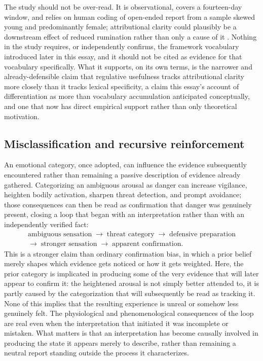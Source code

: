 \documentclass[11pt]{article}
\begin{document}
The study should not be over-read. It is observational, covers a fourteen-day window, and relies on human coding of open-ended report from a sample skewed young and predominantly female; attributional clarity could plausibly be a downstream effect of reduced rumination rather than only a cause of it \citep{LunsfordEddington2026}. Nothing in the study requires, or independently confirms, the framework vocabulary introduced later in this essay, and it should not be cited as evidence for that vocabulary specifically. What it supports, on its own terms, is the narrower and already-defensible claim that regulative usefulness tracks attributional clarity more closely than it tracks lexical specificity, a claim this essay's account of differentiation as more than vocabulary accumulation anticipated conceptually, and one that now has direct empirical support rather than only theoretical motivation.

\subsection{Misclassification and recursive reinforcement}\label{sub:loop}

An emotional category, once adopted, can influence the evidence subsequently encountered rather than remaining a passive description of evidence already gathered. Categorizing an ambiguous arousal as danger can increase vigilance, heighten bodily activation, sharpen threat detection, and prompt avoidance; those consequences can then be read as confirmation that danger was genuinely present, closing a loop that began with an interpretation rather than with an independently verified fact:
\[
\begin{gathered}\text{ambiguous sensation} \;\rightarrow\; \text{threat category} \;\rightarrow\; \text{defensive preparation}\\ \rightarrow\; \text{stronger sensation} \;\rightarrow\; \text{apparent confirmation}.\end{gathered}
\]
This is a stronger claim than ordinary confirmation bias, in which a prior belief merely shapes which evidence gets noticed or how it gets weighted. Here, the prior category is implicated in producing some of the very evidence that will later appear to confirm it: the heightened arousal is not simply better attended to, it is partly caused by the categorization that will subsequently be read as tracking it. None of this implies that the resulting experience is unreal or somehow less genuinely felt. The physiological and phenomenological consequences of the loop are real even when the interpretation that initiated it was incomplete or mistaken. What matters is that an interpretation has become causally involved in producing the state it appears merely to describe, rather than remaining a neutral report standing outside the process it characterizes.
\end{document}
